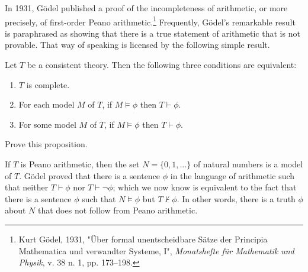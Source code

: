 In 1931, G{\"o}del published a proof of the incompleteness of
arithmetic, or more precisely, of first-order Peano
arithmetic.\footnote{Kurt G{\"o}del, 1931, "{\"U}ber formal
  unentscheidbare S{\"a}tze der Principia Mathematica und verwandter
  Systeme, I", {\it Monatshefte f{\"u}r Mathematik und Physik}, v. 38
  n. 1, pp. 173--198.} Frequently, G{\"o}del's remarkable result is
paraphrased as showing that there is a true statement of arithmetic
that is not provable.  That way of speaking is licensed by the
following simple result.

\begin{prop} Let $T$ be a consistent theory.  Then the following three
  conditions are equivalent:
  \begin{enumerate}
  \item $T$ is complete.
  \item For each model $M$ of $T$, if $M\vDash\phi$ then
    $T\vdash\phi$.
  \item For some model $M$ of $T$, if $M\vDash\phi$ then
    $T\vdash\phi$. \end{enumerate} \end{prop}

\begin{exercise} Prove this proposition. \end{exercise}




If $T$ is Peano arithmetic, then the set $N=\{ 0,1,\dots \}$ of
natural numbers is a model of $T$.  G{\"o}del proved that there is a
sentence $\phi$ in the language of arithmetic such that neither
$T\vdash\phi$ nor $T\vdash\neg\phi$; which we now know is equivalent
to the fact that there is a sentence $\phi$ such that $N\vDash\phi$
but $T\not\vdash\phi$.  In other words, there is a truth $\phi$ about
$N$ that does not follow from Peano arithmetic.

